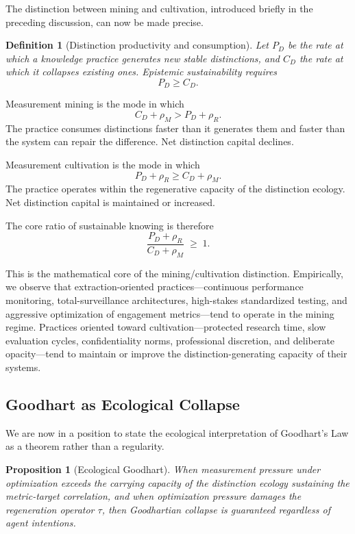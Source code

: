 \documentclass[12pt, a4paper]{article}
\theoremstyle{flyxion}
\newtheorem{definition}{Definition}
\newtheorem{proposition}{Proposition}
\newcommand{\rhoM}{\rho_{M}}
\newcommand{\rhoR}{\rho_{R}}
\begin{document}
The distinction between mining and cultivation, introduced briefly in the preceding discussion, can now be made precise.

\begin{definition}[Distinction productivity and consumption]
Let $P_D$ be the rate at which a knowledge practice generates new stable distinctions, and $C_D$ the rate at which it collapses existing ones. Epistemic sustainability requires
\[
  P_D \geq C_D.
\]
\end{definition}

Measurement mining is the mode in which
\[
  C_D + \rhoM > P_D + \rhoR.
\]
The practice consumes distinctions faster than it generates them and faster than the system can repair the difference. Net distinction capital declines.

Measurement cultivation is the mode in which
\[
  P_D + \rhoR \geq C_D + \rhoM.
\]
The practice operates within the regenerative capacity of the distinction ecology. Net distinction capital is maintained or increased.

The core ratio of sustainable knowing is therefore
\[
  \frac{P_D + \rhoR}{C_D + \rhoM} \;\geq\; 1.
\]

This is the mathematical core of the mining/cultivation distinction. Empirically, we observe that extraction-oriented practices---continuous performance monitoring, total-surveillance architectures, high-stakes standardized testing, and aggressive optimization of engagement metrics---tend to operate in the mining regime. Practices oriented toward cultivation---protected research time, slow evaluation cycles, confidentiality norms, professional discretion, and deliberate opacity---tend to maintain or improve the distinction-generating capacity of their systems.

\subsection*{Goodhart as Ecological Collapse}

We are now in a position to state the ecological interpretation of Goodhart's Law as a theorem rather than a regularity.

\begin{proposition}[Ecological Goodhart]
When measurement pressure under optimization exceeds the carrying capacity of the distinction ecology sustaining the metric-target correlation, and when optimization pressure damages the regeneration operator $\tau$, then Goodhartian collapse is guaranteed regardless of agent intentions.
\end{proposition}
\end{document}
